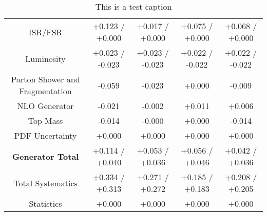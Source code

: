 \begin{table}[htbp]
\begin{center}
\begin{tabular}{|c|c|c|c|c|}
ISR/FSR                               &+0.123   / +0.000   & +0.017   / +0.000   & +0.075   / +0.000   & +0.068   / +0.000  \\
Luminosity                            &+0.023   / -0.023   & +0.023   / -0.023   & +0.022   / -0.022   & +0.022   / -0.022  \\
Parton Shower and Fragmentation       &-0.059              & -0.023              & +0.000              & -0.009             \\
NLO Generator                         &-0.021              & -0.002              & +0.011              & +0.006             \\
Top Mass                              &-0.014              & -0.000              & +0.000              & -0.014             \\
PDF Uncertainty                       &+0.000              & +0.000              & +0.000              & +0.000             \\
\hline
\textbf{Generator Total}              &+0.114   / +0.040   & +0.053   / +0.036   & +0.056   / +0.046   & +0.042   / +0.036  \\
\hline
\hline
Total Systematics                     &+0.334   / +0.313   & +0.271   / +0.272   & +0.185   / +0.183   & +0.208   / +0.205  \\
Statistics                            &+0.000              & +0.000              & +0.000              & +0.000             \\
\hline
  \end{tabular}
  \end{center} 
  \label{tab:xsec_nominal_deltaPhi_low}
  \caption{This is a test caption}
\end{table}
 
 

\clearpage

